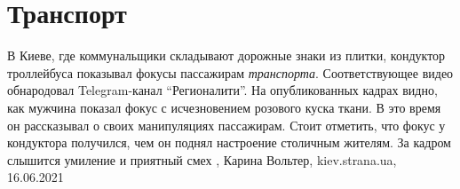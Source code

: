  
 
 
 
 
\chapter{Транспорт}

В Киеве, где коммунальщики складывают дорожные знаки из плитки, кондуктор
троллейбуса показывал фокусы пассажирам \emph{транспорта}.  Соответствующее видео
обнародовал Telegram-канал \enquote{Регионалити}.  На опубликованных кадрах видно, как
мужчина показал фокус с исчезновением розового куска ткани. В это время он
рассказывал о своих манипуляциях пассажирам. Стоит отметить, что фокус у
кондуктора получился, чем он поднял настроение столичным жителям. За кадром
слышится умиление и приятный смех
, 
Карина Вольтер, kiev.strana.ua, 16.06.2021

